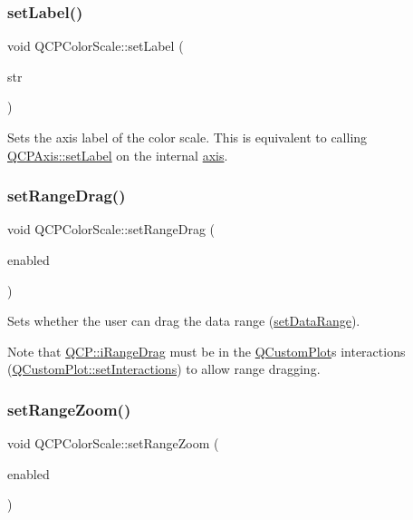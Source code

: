 \subsubsection{\texorpdfstring{set\+Label()}{setLabel()}}
{\footnotesize\ttfamily void Q\+C\+P\+Color\+Scale\+::set\+Label (\begin{DoxyParamCaption}\item[{const Q\+String \&}]{str }\end{DoxyParamCaption})}

Sets the axis label of the color scale. This is equivalent to calling \mbox{\hyperlink{class_q_c_p_axis_a33bcc382c111c9f31bb0687352a2dea4}{Q\+C\+P\+Axis\+::set\+Label}} on the internal \mbox{\hyperlink{class_q_c_p_color_scale_a39bdbdb3b212602a5a57f9f3ea444190}{axis}}. \mbox{\label{class_q_c_p_color_scale_a21c51a55e4fd581b6feadca9ee5b38d5}} 
\subsubsection{\texorpdfstring{set\+Range\+Drag()}{setRangeDrag()}}
{\footnotesize\ttfamily void Q\+C\+P\+Color\+Scale\+::set\+Range\+Drag (\begin{DoxyParamCaption}\item[{bool}]{enabled }\end{DoxyParamCaption})}

Sets whether the user can drag the data range (\mbox{\hyperlink{class_q_c_p_color_scale_abe88633003a26d1e756aa74984587fef}{set\+Data\+Range}}).

Note that \mbox{\hyperlink{namespace_q_c_p_a2ad6bb6281c7c2d593d4277b44c2b037a2c4432b9aceafb94000be8d1b589ef18}{Q\+C\+P\+::i\+Range\+Drag}} must be in the \mbox{\hyperlink{class_q_custom_plot}{Q\+Custom\+Plot}}\textquotesingle{}s interactions (\mbox{\hyperlink{class_q_custom_plot_a5ee1e2f6ae27419deca53e75907c27e5}{Q\+Custom\+Plot\+::set\+Interactions}}) to allow range dragging. \mbox{\label{class_q_c_p_color_scale_a96bd60fb6317ad6821841b539c93eeeb}} 
\subsubsection{\texorpdfstring{set\+Range\+Zoom()}{setRangeZoom()}}
{\footnotesize\ttfamily void Q\+C\+P\+Color\+Scale\+::set\+Range\+Zoom (\begin{DoxyParamCaption}\item[{bool}]{enabled }\end{DoxyParamCaption})}

